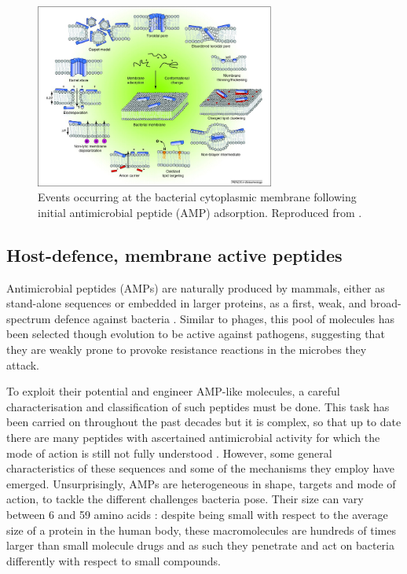 \begin{figure}
\begin{center}
\includegraphics[width = 0.7\textwidth]{1introduction/pics/amp_mech.jpg}
\caption[Antimicrobial peptides]{Events occurring at the bacterial cytoplasmic membrane following initial antimicrobial peptide (AMP) adsorption. Reproduced from \cite{Nguyen2011}.} \label{fig:amp}
\end{center}
\end{figure}


\subsection{Host-defence, membrane active peptides} \label{sec:host-defense-peptides}
Antimicrobial peptides (AMPs) are naturally produced by mammals, either as stand-alone sequences or embedded in larger proteins, as a first, weak, and broad-spectrum defence against bacteria \cite{Nguyen2011,Bahar2013,Mahlapuu2016,Zhang2016}.
%
Similar to phages, this pool of molecules has been selected though evolution to be active against pathogens, suggesting that they are weakly prone to provoke resistance reactions in the microbes they attack.

To exploit their potential and engineer AMP-like molecules, a careful characterisation and classification of such peptides must be done. This task has been carried on throughout the past decades but it is complex, so that up to date there are many peptides with ascertained antimicrobial activity for which the mode of action is still not fully understood \cite{Ebbensgaard2015}. However, some general characteristics of these sequences and some of the mechanisms they employ have emerged.
%
Unsurprisingly, AMPs are heterogeneous in shape, targets and mode of action, to tackle the different challenges bacteria pose. Their size can vary between 6 and 59 amino acids \cite{Brogden2005}: despite being small with respect to the average size of a protein in the human body, these macromolecules are hundreds of times larger than small molecule drugs and as such they penetrate and act on bacteria differently with respect to small compounds.

